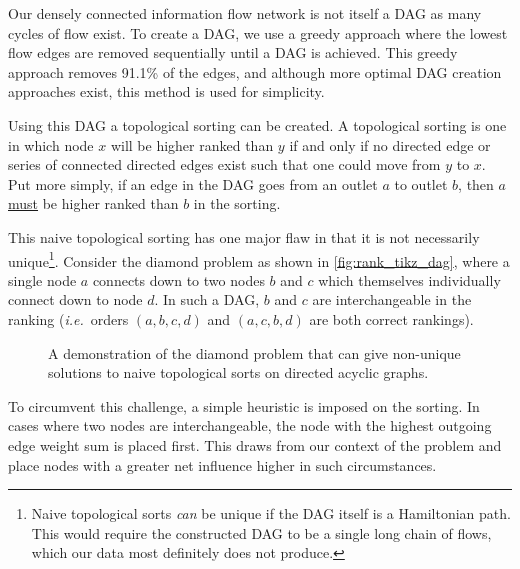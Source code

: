 Our densely connected information flow network is not itself a DAG as many cycles of flow exist. To create a DAG, we use a greedy approach where the lowest flow edges are removed sequentially until a DAG is achieved. This greedy approach removes 91.1\% of the edges, and although more optimal DAG creation approaches exist, this method is used for simplicity. 

Using this DAG a topological sorting can be created. A topological sorting is one in which node $x$ will be higher ranked than $y$ if and only if no directed edge or series of connected directed edges exist such that one could move from $y$ to $x$. Put more simply, if an edge in the DAG goes from an outlet $a$ to outlet $b$, then $a$ \underline{must} be higher ranked than $b$ in the sorting.

This naive topological sorting has one major flaw in that it is not necessarily unique\footnote{Naive topological sorts \emph{can} be unique if the DAG itself is a Hamiltonian path. This would require the constructed DAG to be a single long chain of flows, which our data most definitely does not produce.}. Consider the diamond problem as shown in \autoref{fig:rank_tikz_dag}, where a single node $a$ connects down to two nodes $b$ and $c$ which themselves individually connect down to node $d$. In such a DAG, $b$ and $c$ are interchangeable in the ranking (\emph{i.e.}\ orders $(a,b,c,d)$ and $(a,c,b,d)$ are both correct rankings).

\begin{figure}[!htbp]
\centering
{}
\caption{A demonstration of the diamond problem that can give non-unique solutions to naive topological sorts on directed acyclic graphs.}\label{fig:rank_tikz_dag}
\end{figure}

To circumvent this challenge, a simple heuristic is imposed on the sorting. In cases where two nodes are interchangeable, the node with the highest outgoing edge weight sum is placed first. This draws from our context of the problem and place nodes with a greater net influence higher in such circumstances.

